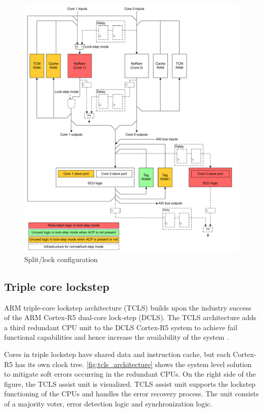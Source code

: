 \begin{figure}[H]

      \centering
      \includegraphics[width=1\linewidth]{images/split_lock_configuration.pdf}
      \caption{Split/lock configuration \citep{cortex_r8_reference_manual}}
      \label{fig:split_lock_configuration}
    
\end{figure}

\subsection{Triple core lockstep}

ARM triple-core lockstep architecture (TCLS) builds upon the industry success of the ARM Cortex-R5 dual-core lock-step (DCLS). The TCLS architecture adds a third redundant CPU unit to the DCLS Cortex-R5 system to achieve fail functional capabilities and hence increase the availability of the system \citep{TCLS_cortex_r}.

Cores in triple lockstep have shared data and instruction cache, but each Cortex-R5 has its own clock tree. \autoref{fig:tcls_architecture} shows the system level solution to mitigate soft errors occurring in the redundant CPUs. On the right side of the figure, the TCLS assist unit is visualized. TCLS assist unit supports the lockstep functioning of the CPUs and handles the error recovery process. The unit consists of a majority voter, error detection logic and synchronization logic.


